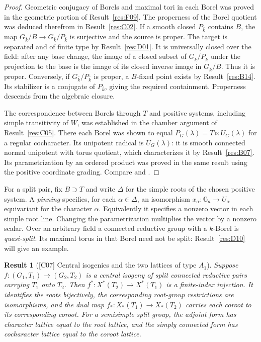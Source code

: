 \documentclass[11pt,a4paper,openany,oneside]{book}
\theoremstyle{resultstyle}
\newtheorem{statement}{Result}[chapter]
\newenvironment{result}[2]{\clubpenalty=10000\begin{statement}[\textnormal{[#1]} #2]\leavevmode\label{res:#1}\ignorespaces}{\end{statement}}
\theoremstyle{definition}
\numberwithin{equation}{chapter}
\newcommand{\Ga}{\mathbb{G}_a}
\begin{document}
\begin{proof}
Geometric conjugacy of Borels and maximal tori in each Borel
was proved in the geometric portion of Result~\ref{res:F09}.
The properness of the Borel quotient was deduced therefrom
in Result~\ref{res:C02}. If a smooth closed \(P_{\bar k}\)
contains \(B\), the map \(G_{\bar k}/B\to G_{\bar k}/P_{\bar k}\)
is surjective and the source is proper. The target is separated
and of finite type by Result~\ref{res:D01}. It is universally
closed over the field: after any base change, the image
of a closed subset of \(G_{\bar k}/P_{\bar k}\) under the
projection to the base is the image of its closed inverse
image in \(G_{\bar k}/B\). Thus it is proper. Conversely,
if \(G_{\bar k}/P_{\bar k}\) is proper, a \(B\)-fixed point
exists by Result~\ref{res:B14}. Its stabilizer is a conjugate
of \(P_{\bar k}\), giving the required containment.
Properness descends from the algebraic closure.

The correspondence between Borels through \(T\) and
positive systems, including simple transitivity of \(W\),
was established in the chamber argument of
Result~\ref{res:C05}. There each Borel was shown to
equal \(P_G(\lambda)=T\ltimes U_G(\lambda)\) for a
regular cocharacter. Its unipotent radical is \(U_G(\lambda)\):
it is smooth connected normal unipotent with torus quotient,
which characterizes it by Result~\ref{res:B07}. Its
parametrization by an ordered product was proved in the
same result using the positive coordinate grading.
Compare \cite[Section 21.d]{milne} and \cite[Theorem 5.1.13]{conrad}.
\end{proof}

For a split pair, fix \(B\supset T\) and write \(\Delta\) for the simple roots of the chosen positive system. A \emph{pinning} specifies, for each \(\alpha\in\Delta\), an isomorphism \(x_\alpha:\Ga\to U_\alpha\) equivariant for the character \(\alpha\). Equivalently it specifies a nonzero vector in each simple root line. Changing the parametrization multiplies the vector by a nonzero scalar. Over an arbitrary field a connected reductive group with a \(k\)-Borel is \emph{quasi-split}. Its maximal torus in that Borel need not be split: Result~\ref{res:D10} will give an example.

\begin{result}{C07}{Central isogenies and the two lattices of type \(A_1\)}
Suppose \(f:(G_1,T_1)\to(G_2,T_2)\) is a central isogeny of split connected reductive pairs carrying \(T_1\) onto \(T_2\). Then \(f^*:X^*(T_2)\to X^*(T_1)\) is a finite-index injection. It identifies the roots bijectively, the corresponding root-group restrictions are isomorphisms, and the dual map \(f_*:X_*(T_1)\to X_*(T_2)\) carries each coroot to its corresponding coroot. For a semisimple split group, the adjoint form has character lattice equal to the root lattice, and the simply connected form has cocharacter lattice equal to the coroot lattice.
\end{result}
\end{document}
